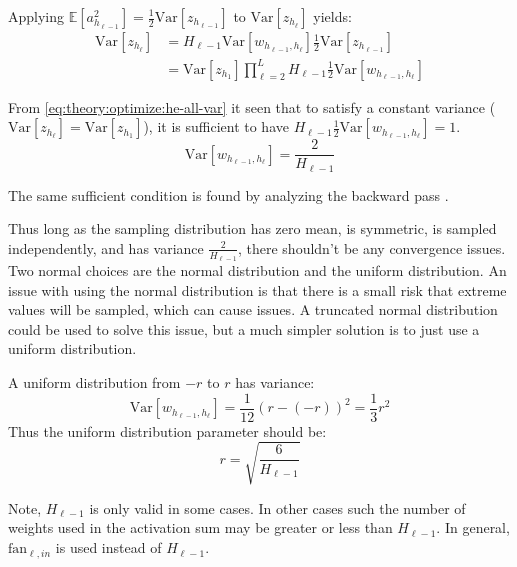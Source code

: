 Applying $\mathbb{E}[a_{h_{\ell-1}}^2] = \frac{1}{2} \mathrm{Var}[z_{h_{\ell-1}}]$ to $\mathrm{Var}[z_{h_\ell}]$ yields:
\begin{equation}
\begin{aligned}
\mathrm{Var}[z_{h_\ell}] &= H_{\ell-1} \mathrm{Var}[w_{h_{\ell-1}, h_{\ell}}] \frac{1}{2} \mathrm{Var}[z_{h_{\ell-1}}] \\
&= \mathrm{Var}[z_{h_1}] \prod_{\ell=2}^L H_{\ell-1} \frac{1}{2} \mathrm{Var}[w_{h_{\ell-1}, h_{\ell}}]
\end{aligned}
\label{eq:theory:optimize:he-all-var}
\end{equation}

From \eqref{eq:theory:optimize:he-all-var} it seen that to satisfy a constant variance ($\mathrm{Var}[z_{h_\ell}] = \mathrm{Var}[z_{h_1}]$), it is sufficient to have ${H_{\ell-1} \frac{1}{2} \mathrm{Var}[w_{h_{\ell-1}, h_{\ell}}] = 1}$.
\begin{equation}
\mathrm{Var}[w_{h_{\ell-1}, h_{\ell}}] = \frac{2}{H_{\ell-1}}
\end{equation}

The same sufficient condition is found by analyzing the backward pass \cite{he-initialization}.

Thus long as the sampling distribution has zero mean, is symmetric, is sampled independently, and has variance $\frac{2}{H_{\ell-1}}$, there shouldn't be any convergence issues. Two normal choices are the normal distribution and the uniform distribution. An issue with using the normal distribution is that there is a small risk that extreme values will be sampled, which can cause issues. A truncated normal distribution could be used to solve this issue, but a much simpler solution is to just use a uniform distribution.

A uniform distribution from $-r$ to $r$ has variance:
\begin{equation}
\mathrm{Var}[w_{h_{\ell-1}, h_{\ell}}] = \frac{1}{12} (r - (-r))^2 = \frac{1}{3} r^2
\end{equation}
Thus the uniform distribution parameter should be:
\begin{equation}
r = \sqrt{\frac{6}{H_{\ell-1}}}
\end{equation}

Note, $H_{\ell-1}$ is only valid in some cases. In other cases such the number of weights used in the activation sum may be greater or less than $H_{\ell-1}$. In general, $\mathrm{fan}_{\ell, in}$ is used instead of $H_{\ell-1}$.
